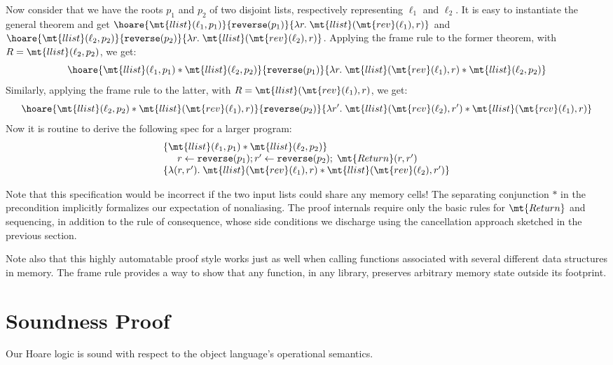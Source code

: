 \documentclass{amsbook}
\theoremstyle{definition}
\theoremstyle{remark}
\numberwithin{section}{chapter}
\numberwithin{equation}{chapter}
\begin{document}
Now consider that we have the roots $p_1$ and $p_2$ of two disjoint lists, respectively representing $\ell_1$ and $\ell_2$.
It is easy to instantiate the general theorem and get $\hoare{\mt{llist}(\ell_1, p_1)}{\texttt{reverse}(p_1)}{\lambda r. \; \mt{llist}(\mt{rev}(\ell_1), r)}$ and $\hoare{\mt{llist}(\ell_2, p_2)}{\texttt{reverse}(p_2)}{\lambda r. \; \mt{llist}(\mt{rev}(\ell_2), r)}$.
Applying the frame rule to the former theorem, with $R = \mt{llist}(\ell_2, p_2)$, we get:
$$\hoare{\mt{llist}(\ell_1, p_1) * \mt{llist}(\ell_2, p_2)}{\texttt{reverse}(p_1)}{\lambda r. \; \mt{llist}(\mt{rev}(\ell_1), r) * \mt{llist}(\ell_2, p_2)}$$
Similarly, applying the frame rule to the latter, with $R = \mt{llist}(\mt{rev}(\ell_1), r)$, we get:
$$\hoare{\mt{llist}(\ell_2, p_2) * \mt{llist}(\mt{rev}(\ell_1), r)}{\texttt{reverse}(p_2)}{\lambda r'. \; \mt{llist}(\mt{rev}(\ell_2), r') * \mt{llist}(\mt{rev}(\ell_1), r)}$$
Now it is routine to derive the following spec for a larger program:
$$\begin{array}{l}
  \{\mt{llist}(\ell_1, p_1) * \mt{llist}(\ell_2, p_2)\} \\
  \hspace{.2in} r \leftarrow \texttt{reverse}(p_1); r' \leftarrow \texttt{reverse}(p_2); \; \mt{Return}(r, r') \\
  \{\lambda (r, r'). \; \mt{llist}(\mt{rev}(\ell_1), r) * \mt{llist}(\mt{rev}(\ell_2), r')\}
\end{array}$$

Note that this specification would be incorrect if the two input lists could share any memory cells!
The separating conjunction $*$ in the precondition implicitly formalizes our expectation of nonaliasing.
The proof internals require only the basic rules for $\mt{Return}$ and sequencing, in addition to the rule of consequence, whose side conditions we discharge using the cancellation approach sketched in the previous section.

Note also that this highly automatable proof style works just as well when calling functions associated with several different data structures in memory.
The frame rule provides a way to show that any function, in any library, preserves arbitrary memory state outside its footprint.

\section{Soundness Proof}

Our Hoare logic is sound with respect to the object language's operational semantics.
\end{document}
